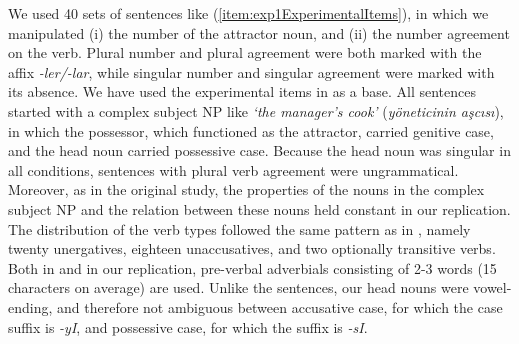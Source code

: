 \documentclass[doc,a4paper,man,natbib,floatsintext,noextraspace]{apa6}\usepackage[]{graphicx}\usepackage[]{color}
\begin{document}
We used 40 sets of sentences like (\ref{item:exp1ExperimentalItems}), in which we manipulated 
(i) the number of the attractor noun, and
(ii) the number agreement on the verb. 
Plural number and plural agreement were both marked with the affix \textit{-ler/-lar}, while singular number and singular agreement were marked with its absence. 
%
We have used the experimental items in \citet{LagoEtAl:2018} as a base. 
All sentences started with a complex subject NP like \textit{`the manager's cook'} (\textit{yöneticinin aşcısı}), in which the possessor, which functioned as the attractor, carried genitive case, and the head noun carried possessive case. 
Because the head noun was singular in all conditions, sentences with plural verb agreement were ungrammatical. 
Moreover, as in the original study, the properties of the nouns in the complex subject NP and the relation between these nouns held constant in our replication. 
The distribution of the verb types followed the same pattern as in \citet{LagoEtAl:2018}, namely twenty unergatives, eighteen unaccusatives, and two optionally transitive verbs. 
Both in \citet{LagoEtAl:2018} and in our replication, pre-verbal adverbials consisting of 2-3 words (15 characters on average) are used.
Unlike the \citet{LagoEtAl:2018} sentences, our head nouns were vowel-ending, and therefore not ambiguous between accusative case, for which the case suffix is \textit{-yI}, and possessive case, for which the suffix is \textit{-sI}. 
\end{document}
